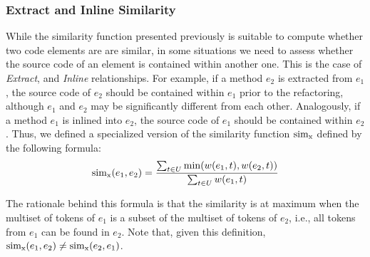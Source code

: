 \subsubsection{Extract and Inline Similarity}

While the similarity function presented previously is suitable to compute whether two code elements are are similar, in some situations we need to assess whether the source code of an element is contained within another one. This is the case of \emph{Extract}, and \emph{Inline} relationships. For example, if a method $e_2$ is extracted from $e_1$, the source code of $e_2$ should be contained within $e_1$ prior to the refactoring, although $e_1$ and $e_2$ may be significantly different from each other. Analogously, if a method $e_1$ is inlined into $e_2$, the source code of $e_1$ should be contained within $e_2$.
Thus, we defined a specialized version of the similarity function $\operatorname{sim_{x}}$ defined by the following formula:
\begin{align}
\operatorname{sim_{x}}(e_1, e_2) = \frac{\sum_{t \in U} \min(w(e_1, t), w(e_2, t))}
                        {\sum_{t \in U} w(e_1, t)}
\end{align}

The rationale behind this formula is that the similarity is at maximum when the multiset of tokens of $e_1$ is a subset of the multiset of tokens of $e_2$, i.e., all tokens from $e_1$ can be found in $e_2$. Note that, given this definition, $\operatorname{sim_{x}}(e_1, e_2) \neq \operatorname{sim_{x}}(e_2, e_1)$.


